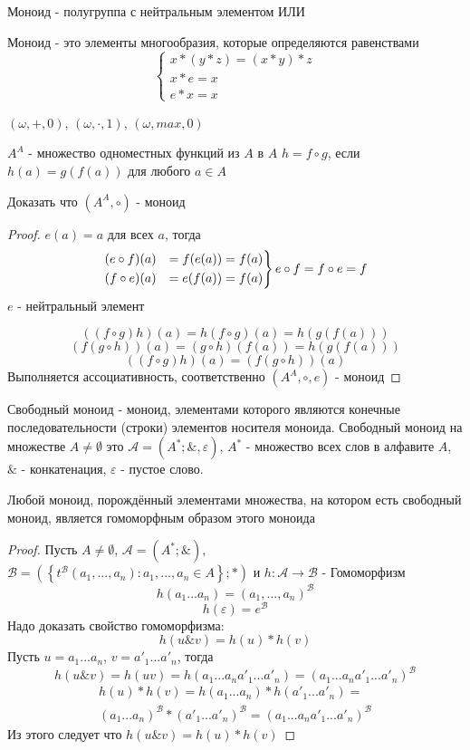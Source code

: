 \documentclass[../main/document.tex]{subfiles}
\begin{document}
\begin{dfn}[Моноид]
Моноид - полугруппа с нейтральным элементом ИЛИ

Моноид - это элементы многообразия, которые определяются равенствами
$$
\begin{cases}
x*(y*z)=(x*y)*z\\
x*e=x\\
e*x=x
\end{cases}$$
\end{dfn}
\begin{exm}

$(\omega,+,0)$, $(\omega,\cdot,1)$, $(\omega,max,0)$

$A^A$ - множество одноместных функций из $A$ в $A$
$h=f\circ g$, если $h(a)=g(f(a))$ для любого $a\in A$

Доказать что $(A^A,\circ)$ - моноид
\begin{proof}
$e(a)=a$ для всех $a$, тогда
\begin{equation*}
\begin{rcases}
(e\circ f)(a) &= f(e(a))= f(a) \\
(f\circ e)(a) &= e(f(a))= f(a) 
\end{rcases}
e\circ f=f\circ e=f
\end{equation*}
$e$ - нейтральный элемент

$$((f\circ g)h)(a)=h(f\circ g)(a)=h(g(f(a)))$$
$$(f(g\circ h))(a)=(g\circ h)(f(a))=h(g(f(a)))$$
$$((f\circ g)h)(a)=(f(g\circ h))(a)$$
Выполняется ассоциативность, соответственно $(A^A,\circ,e)$ - моноид

\end{proof}
\end{exm}
\begin{dfn}
Свободный моноид - моноид, элементами которого являются конечные последовательности (строки) элементов носителя моноида. Свободный моноид на множестве $A\neq \emptyset$ это $\mathcal{A}=(A^*;\&,\varepsilon)$, $A^*$ - множество всех слов в алфавите $A$, $\&$ - конкатенация, $\varepsilon$ - пустое слово.
\end{dfn}
\begin{thm}
Любой моноид, порождённый элементами множества, на котором есть свободный моноид, является гомоморфным образом этого моноида
\begin{proof}
Пусть $A\neq \emptyset$, $\mathcal{A}=(A^*;\&)$,\\ $\mathcal{B}=(\left\{t^{\mathcal{B}}(a_1,...,a_n): a_1,...,a_n\in A\right\};*)$ и $h:\mathcal{A}\rightarrow \mathcal{B}$ - Гомоморфизм
$$h(a_1...a_n)=(a_1,...,a_n)^{\mathcal{B}}$$
$$h(\varepsilon)=e^{\mathcal{B}}$$
Надо доказать свойство гомоморфизма:
$$h(u\&v)=h(u)*h(v)$$
Пусть $u=a_1...a_n$, $v={a'}_1...{a'}_n$, тогда
$$h(u\&v)=h(uv)=h(a_1...a_n{a'}_1...{a'}_n)=(a_1...a_n{a'}_1...{a'}_n)^{\mathcal{B}}$$
\begin{multline*}
h(u)*h(v)=h(a_1...a_n)*h({a'}_1...{a'}_n)=\\
(a_1...a_n)^{\mathcal{B}}*({a'}_1...{a'}_n)^{\mathcal{B}}=(a_1...a_n{a'}_1...{a'}_n)^{\mathcal{B}}
\end{multline*}
Из этого следует что $h(u\&v)=h(u)*h(v)$
\end{proof}
\end{thm}
\end{document}
